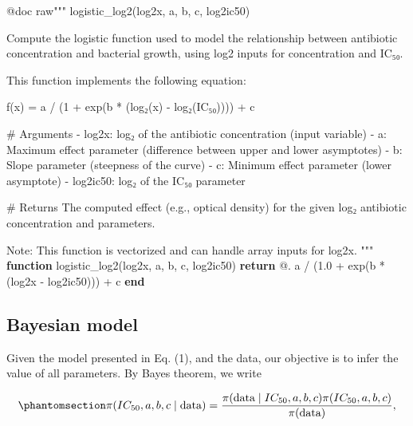 \documentclass[
]{scrartcl}
\newenvironment{Shaded}{\begin{snugshade}}{\end{snugshade}}
\newcommand{\ControlFlowTok}[1]{\textcolor[rgb]{0.00,0.23,0.31}{\textbf{#1}}}
\newcommand{\FloatTok}[1]{\textcolor[rgb]{0.68,0.00,0.00}{#1}}
\newcommand{\FunctionTok}[1]{\textcolor[rgb]{0.28,0.35,0.67}{#1}}
\newcommand{\KeywordTok}[1]{\textcolor[rgb]{0.00,0.23,0.31}{\textbf{#1}}}
\newcommand{\NormalTok}[1]{\textcolor[rgb]{0.00,0.23,0.31}{#1}}
\newcommand{\OperatorTok}[1]{\textcolor[rgb]{0.37,0.37,0.37}{#1}}
\newcommand{\PreprocessorTok}[1]{\textcolor[rgb]{0.68,0.00,0.00}{#1}}
\newcommand{\StringTok}[1]{\textcolor[rgb]{0.13,0.47,0.30}{#1}}
\begin{document}
\begin{Shaded}
\begin{Highlighting}[]
\PreprocessorTok{@doc} \StringTok{raw"""}
\StringTok{    logistic\_log2(log2x, a, b, c, log2ic50)}

\StringTok{Compute the logistic function used to model the relationship between antibiotic}
\StringTok{concentration and bacterial growth, using log2 inputs for concentration and}
\StringTok{IC₅₀.}

\StringTok{This function implements the following equation:}

\StringTok{f(x) = a / (1 + exp(b * (log₂(x) {-} log₂(IC₅₀)))) + c}

\StringTok{\# Arguments}
\StringTok{{-} \textasciigrave{}log2x\textasciigrave{}: log₂ of the antibiotic concentration (input variable)}
\StringTok{{-} \textasciigrave{}a\textasciigrave{}: Maximum effect parameter (difference between upper and lower asymptotes)}
\StringTok{{-} \textasciigrave{}b\textasciigrave{}: Slope parameter (steepness of the curve)}
\StringTok{{-} \textasciigrave{}c\textasciigrave{}: Minimum effect parameter (lower asymptote)}
\StringTok{{-} \textasciigrave{}log2ic50\textasciigrave{}: log₂ of the IC₅₀ parameter}

\StringTok{\# Returns}
\StringTok{The computed effect (e.g., optical density) for the given log₂ antibiotic}
\StringTok{concentration and parameters.}

\StringTok{Note: This function is vectorized and can handle array inputs for \textasciigrave{}log2x\textasciigrave{}.}
\StringTok{"""}
\KeywordTok{function} \FunctionTok{logistic\_log2}\NormalTok{(log2x, a, b, c, log2ic50)}
    \ControlFlowTok{return}\NormalTok{ @. a }\OperatorTok{/}\NormalTok{ (}\FloatTok{1.0} \OperatorTok{+} \FunctionTok{exp}\NormalTok{(b }\OperatorTok{*}\NormalTok{ (log2x }\OperatorTok{{-}}\NormalTok{ log2ic50))) }\OperatorTok{+}\NormalTok{ c}
\KeywordTok{end}
\end{Highlighting}
\end{Shaded}

\subsection{Bayesian model}\label{bayesian-model}

Given the model presented in Eq. (1), and the data, our objective is to
infer the value of all parameters. By Bayes theorem, we write

\begin{equation}\phantomsection\label{eq-iwasawa-bayesian-model}{
\pi(IC_{50}, a, b, c \mid \text{data}) = 
\frac{\pi(\text{data} \mid IC_{50}, a, b, c) 
\pi(IC_{50}, a, b, c)}
{\pi(\text{data})},
}\end{equation}
\end{document}
